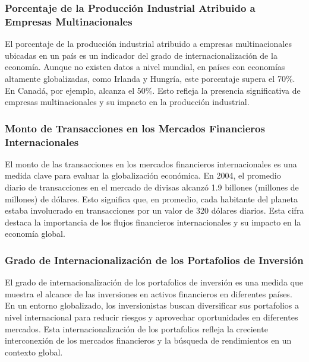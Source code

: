 \documentclass[
  a4paper,
]{article}
\begin{document}
\subsubsection{Porcentaje de la Producción Industrial Atribuido a
Empresas
Multinacionales}\label{porcentaje-de-la-producciuxf3n-industrial-atribuido-a-empresas-multinacionales}

El porcentaje de la producción industrial atribuido a empresas
multinacionales ubicadas en un país es un indicador del grado de
internacionalización de la economía. Aunque no existen datos a nivel
mundial, en países con economías altamente globalizadas, como Irlanda y
Hungría, este porcentaje supera el 70\%. En Canadá, por ejemplo, alcanza
el 50\%. Esto refleja la presencia significativa de empresas
multinacionales y su impacto en la producción industrial.

\subsubsection{Monto de Transacciones en los Mercados Financieros
Internacionales}\label{monto-de-transacciones-en-los-mercados-financieros-internacionales}

El monto de las transacciones en los mercados financieros
internacionales es una medida clave para evaluar la globalización
económica. En 2004, el promedio diario de transacciones en el mercado de
divisas alcanzó 1.9 billones (millones de millones) de dólares. Esto
significa que, en promedio, cada habitante del planeta estaba
involucrado en transacciones por un valor de 320 dólares diarios. Esta
cifra destaca la importancia de los flujos financieros internacionales y
su impacto en la economía global.

\subsubsection{Grado de Internacionalización de los Portafolios de
Inversión}\label{grado-de-internacionalizaciuxf3n-de-los-portafolios-de-inversiuxf3n}

El grado de internacionalización de los portafolios de inversión es una
medida que muestra el alcance de las inversiones en activos financieros
en diferentes países. En un entorno globalizado, los inversionistas
buscan diversificar sus portafolios a nivel internacional para reducir
riesgos y aprovechar oportunidades en diferentes mercados. Esta
internacionalización de los portafolios refleja la creciente
interconexión de los mercados financieros y la búsqueda de rendimientos
en un contexto global.
\end{document}
